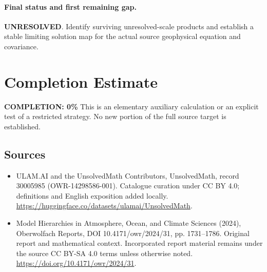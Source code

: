 \documentclass[11pt]{article}
\begin{document}
\paragraph{Final status and first remaining gap.}
\textbf{UNRESOLVED}. Identify surviving unresolved-scale products and establish a stable limiting solution map for the actual source geophysical equation and covariance.

\section{Completion Estimate}
\noindent\textbf{COMPLETION: 0\%}
This is an elementary auxiliary calculation or an explicit test of a restricted strategy. No new portion of the full source target is established.

\subsection{Sources}
\begin{itemize}
\item[\hypertarget{source:30005985:1}{S1}] ULAM.AI and the UnsolvedMath Contributors, UnsolvedMath, record 30005985 (OWR-14298586-001). Catalogue curation under CC BY 4.0; definitions and English exposition added locally.
\url{https://huggingface.co/datasets/ulamai/UnsolvedMath}.
\item[\hypertarget{source:30005985:2}{S2}] Model Hierarchies in Atmosphere, Ocean, and Climate Sciences (2024), Oberwolfach Reports, DOI 10.4171/owr/2024/31, pp. 1731--1786. Original report and mathematical context. Incorporated report material remains under the source CC BY-SA 4.0 terms unless otherwise noted.
\url{https://doi.org/10.4171/owr/2024/31}.
\end{itemize}
\label{end:30005985}
\end{document}
